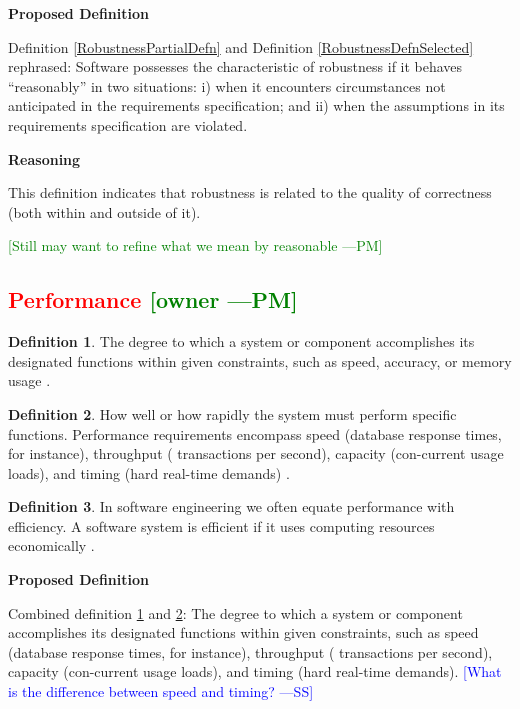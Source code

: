 \documentclass[letterpaper,cleveref]{lipics-v2019}
\newcommand{\authornote}[3]{\textcolor{#1}{[#3 ---#2]}}
\newcommand{\authornote}[3]{}
\newcommand{\wss}[1]{\authornote{blue}{SS}{#1}} %
\newcommand{\pmi}[1]{\authornote{green}{PM}{#1}} %
\newcommand{\notdone}[1]{\textcolor{red}{#1}}
\theoremstyle{definition}
\newtheorem{defn}{Definition}
\begin{document}
\noindent \textbf{Proposed Definition}

Definition \ref{RobustnessPartialDefn} and Definition
\ref{RobustnessDefnSelected} rephrased: Software possesses the
characteristic of robustness if it behaves ``reasonably'' in two situations: i)
when it encounters circumstances not anticipated in the requirements
specification; and ii) when the assumptions in its requirements specification
are violated.

\noindent \textbf{Reasoning}

This definition indicates that robustness is related to the quality of
correctness (both within and outside of it). 

\pmi{Still may want to refine what we mean by reasonable}

\subsection{\notdone{Performance} \pmi{owner}}

\begin{defn} \label{PerformanceDefnSelected}
	The degree to which a system or component accomplishes its designated functions
	within given constraints, such as speed, accuracy, or memory usage
	\citep{IEEEStdGlossarySET1990}.
\end{defn}
\begin{defn} \label{PerformanceDefnSelected2}
	How well or how rapidly the system must perform specific functions. Performance
	requirements encompass speed (database response times, for instance), throughput
	( transactions per second), capacity (con-current usage loads), and timing (hard
	real-time demands) \citep{wiegers2003softreq}.
\end{defn}
\begin{defn}
	In software engineering we often equate performance with efficiency. A software
	system is efficient if it uses computing resources economically
	\citep{ghezzi1991fundamentals}.
\end{defn}

\noindent \textbf{Proposed Definition}

Combined definition \ref{PerformanceDefnSelected} and
\ref{PerformanceDefnSelected2}: The degree to which a system or component
accomplishes its designated functions within given constraints, such as speed
(database response times, for instance), throughput ( transactions per second),
capacity (con-current usage loads), and timing (hard real-time
demands). \wss{What is the difference between speed and timing?}
\end{document}
